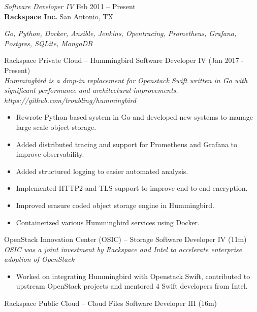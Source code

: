 \documentclass[margin,line]{resume}
\begin{document}
\begin{resume}
{\sl Software Developer IV } \hfill
     Feb 2011 -- Present\\
     \textbf{Rackspace Inc.} \hfill
     San Antonio, TX\\[4pt]
{\small\centering\textit{Go, Python, Docker, Ansible, Jenkins, Opentracing, Prometheus, Grafana, Postgres, SQLite, MongoDB}\par}\vspace*{-\baselineskip}
\vspace{4pt}
{\small Rackspace Private Cloud -- Hummingbird  \hfill  Software Developer IV (Jan 2017 - Present)}\\
{\small\textit{Hummingbird is a drop-in replacement for Openstack
Swift written in Go with significant performance and architectural improvements. https://github.com/troubling/hummingbird}}
\begin{itemize} \itemsep -2pt %
\small\item Rewrote Python based system in Go and developed new systems to manage large scale object storage.
\small\item Added distributed tracing and support for Prometheus and Grafana to improve observability.
\small\item Added structured logging to easier automated analysis.
\small\item Implemented HTTP2 and TLS support to improve end-to-end encryption.
\small\item Improved erasure coded object storage engine in Hummingbird.
\small\item Containerized various Hummingbird services using Docker.
\end{itemize}\vspace*{-\baselineskip} %
\vspace{4pt}
{\small OpenStack Innovation Center (OSIC) -- Storage  \hfill  Software Developer IV (11m)}\\
{\small\textit{OSIC was a joint investment by Rackspace and Intel to accelerate enterprise adoption of OpenStack}}
\begin{itemize} \itemsep -2pt %
\small\item Worked on integrating Hummingbird with Openstack Swift, contributed to upstream OpenStack projects and mentored 4 Swift developers from Intel.
\end{itemize}\vspace*{-\baselineskip} %
\vspace{4pt}
{\small Rackspace Public Cloud -- Cloud Files  \hfill  Software Developer III (16m)}\\

\end{resume}
\end{document}
